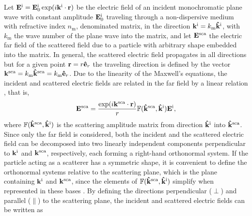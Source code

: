 
Let $\vb{E}^\text{i} = \vb{E}^\text{i}_0 \exp(i\vb{k}^\text{i}\cdot\vb{r})$ be the electric field of an incident monochromatic plane wave with constant amplitude $\vb{E}_0^\text{i}$  traveling through a non-dispersive medium with refractive index $n_\text{m}$, denominated matrix, in the direction $\vb{k}^\text{i} = k_\text{m}\vu{k}^\text{i}$, with $k_\text{m}$ the wave number of the plane wave into the matrix, and let $\vb{E}^\text{sca}$ the electric far field of the scattered field due to a particle with arbitrary shape embedded into the matrix. In general, the scattered electric field propagates in all directions but for a given point $\vb{r} = r\vu{e}_r$ the traveling direction is defined by the vector $\vb{k}^\text{sca} = k_\text{m}\vu{k}^\text{sca} = k_\text{m}\vu{e}_r$.  Due to the linearity of the Maxwell's equations,   the incident and scattered electric fields are related in the far field by a linear relation \cite{tsang_scattering_2000}, that is,
%
 \begin{equation}
	\vb{E}^\text{sca} =   \frac{\exp(i\vb{k}^\text{sca}\cdot\vb{r})}{r} \mathbb{F}(\vu{k}^\text{sca}, \vu{k}^\text{i}) \vb{E}^\text{i},
 \label{eq:ScatAmpMat}
 \end{equation}
%
where $\mathbb{F}(\vu{k}^\text{sca}, \vu{k}^\text{i})$ is the scattering  amplitude matrix from direction $\vu{k}^\text{i}$ into $\vu{k}^\text{sca}$. Since only the far field is considered, both the incident and the scattered electric field can be decomposed into two linearly independent components perpendicular to $\vb{k}^\text{i}$ and $\vb{k}^\text{sca}$, respectively, each forming a right-hand orthonormal system. If the particle acting as a scatterer has a symmetric shape, it is convenient to define the orthonormal systems relative to the scattering plane, which is the plane containing $\vb{k}^\text{i}$ and $\vb{k}^\text{sca}$, since the elements of $\mathbb{F}(\vu{k}^\text{sca}, \vu{k}^\text{i})$ simplify when represented in these bases \cite{tsang_scattering_2000}. By defining the directions perpendicular  ($\perp$) and parallel ($\parallel$) to the scattering plane, the incident and scattered electric fields can be written as
%
